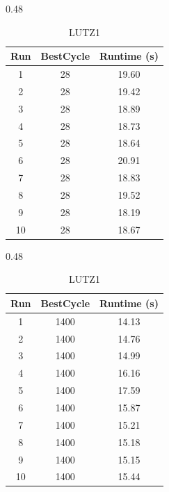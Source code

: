 \documentclass[12pt,a4paper]{article}
\begin{document}
\begin{table}[t]
\begin{subtable}{0.48\textwidth}
\centering
\caption{SAWYER30}
\begin{tabular}{ccc}
\toprule
Run & BestCycle & Runtime (s) \\
\midrule
1  & 28 & 19.60 \\
2  & 28 & 19.42 \\
3  & 28 & 18.89 \\
4  & 28 & 18.73 \\
5  & 28 & 18.64 \\
6  & 28 & 20.91 \\
7  & 28 & 18.83 \\
8  & 28 & 19.52 \\
9  & 28 & 18.19 \\
10 & 28 & 18.67 \\
\bottomrule
\end{tabular}
\end{subtable}
\hfill
\begin{subtable}{0.48\textwidth}
\centering
\caption{LUTZ1}
\begin{tabular}{ccc}
\toprule
Run & BestCycle & Runtime (s) \\
\midrule
1  & 1400 & 14.13 \\
2  & 1400 & 14.76 \\
3  & 1400 & 14.99 \\
4  & 1400 & 16.16 \\
5  & 1400 & 17.59 \\
6  & 1400 & 15.87 \\
7  & 1400 & 15.21 \\
8  & 1400 & 15.18 \\
9  & 1400 & 15.15 \\
10 & 1400 & 15.44 \\
\bottomrule
\end{tabular}
\end{subtable}

\end{table}
\end{document}
